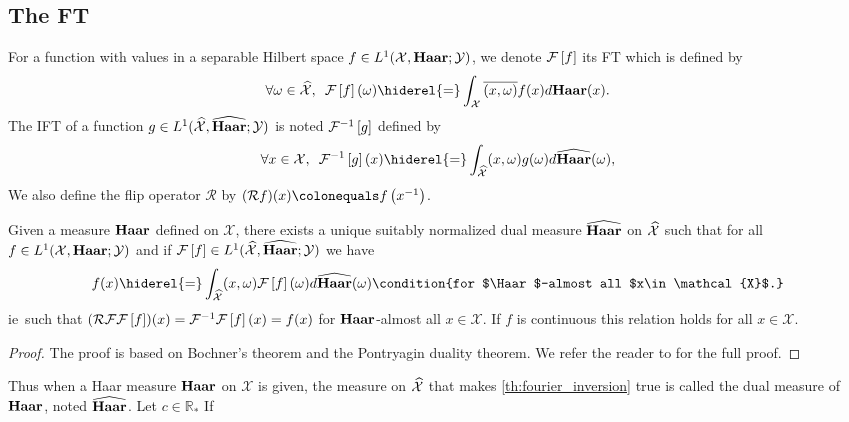 \subsection[The Fourier Transform]{The \acl{FT}}
For a function with values in a separable Hilbert space $f\in
L^1(\mathcal{X},\mathbf{Haar};\mathcal{Y})$, we denote $\mathcal{F}\left[f\right]$ its \acf{FT} which is
defined by
\begin{dmath*}
        \forall \omega \in \dual{\mathcal{X}},\enskip \FT{f}(\omega)
        \hiderel{=}\int_{\mathcal{X}} \conj{\pairing{x,\omega}}f(x)d\Haar(x).
\end{dmath*}
The \acf{IFT} of a function $g\in L^1(\widehat{\mathcal{X}},\widehat{\mathbf{Haar}};
\mathcal{Y})$ is noted $\mathcal{F}^{-1}\left[g\right]$ defined by
\begin{dmath*}
    \forall x \in \mathcal{X},\enskip \IFT{g}(x) 
    \hiderel{=}\int_{\dual{\mathcal{X}}} \pairing{x,\omega}g(\omega)
    d\dual{\Haar}(\omega),
\end{dmath*}
We also define the flip operator $\mathcal{R}$ by $(\mathcal{R}f)(x)
\colonequals f\left(\inv{x}\right)$.
\begin{theorem}
    \label{th:fourier_inversion} Given a measure $\Haar$ defined on
    $\mathcal{X}$, there exists a unique suitably normalized dual measure
    $\widehat{\mathbf{Haar}}$ on $\widehat{\mathcal{X}}$ such that for all $f \in
    L^1(\mathcal{X}, \mathbf{Haar};\mathcal{Y})$ and if $\mathcal{F}\left[f\right] \in
    L^1(\widehat{\mathcal{X}}, \widehat{\mathbf{Haar}}; \mathcal{Y})$ we have
    \begin{dmath}
        \label{fourier-l1} f(x) \hiderel{=} \int_{\dual{\mathcal{X}}}
        \pairing{x, \omega} \FT{f}(\omega) d\dual{\Haar}(\omega) \condition{for
        $\Haar$-almost all $x\in \mathcal{X}$.}
    \end{dmath}
    \acs{ie}~such that
    $(\mathcal{R}\mathcal{F}\mathcal{F}\left[f\right])(x)=\mathcal{F}^{-1}\mathcal{F}\left[f\right](x)=f(x)$ for
    $\Haar$-almost all $x\in\mathcal{X}$. If $f$ is continuous this relation
    holds for all $x\in\mathcal{X}$.
\end{theorem}
\begin{proof}
    The proof is based on Bochner's theorem and the Pontryagin duality theorem.
    We refer the reader to \citet[theorem~4.22 page~105 and theorem~4.33
    page~111]{folland1994course} for the full proof.
\end{proof}
Thus when a Haar measure $\Haar$ on $\mathcal{X}$ is given, the measure on
$\widehat{\mathcal{X}}$ that makes \cref{th:fourier_inversion} true is called the
dual measure of $\Haar$, noted $\widehat{\mathbf{Haar}}$. Let $c\in\mathbb{R}_*$ If
